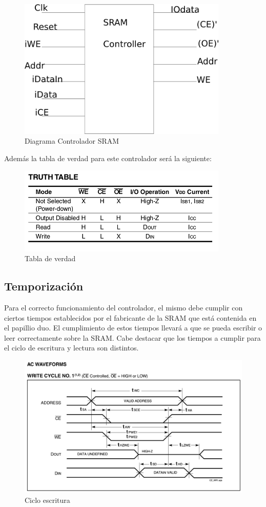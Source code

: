 \documentclass[10pt]{article}
\begin{document}
\begin{figure}[hbtp]
\centering
\includegraphics[width=10cm]{sramcontroller.png}
\caption{Diagrama Controlador SRAM}
\label{Con1}
\end{figure}

Además la tabla de verdad para este controlador será la siguiente:

\begin{figure}[hbtp]
\centering
\includegraphics[width=10cm]{truth-table.png}
\caption{Tabla de verdad}
\label{tab1}
\end{figure}

\newpage

\subsection*{Temporización}

Para el correcto funcionamiento del controlador, el mismo debe cumplir con ciertos tiempos establecidos por el fabricante de la SRAM que está contenida en el papillio duo. El cumplimiento de estos tiempos llevará a que se pueda escribir o leer correctamente sobre la SRAM.
Cabe destacar que los tiempos a cumplir para el ciclo de escritura y lectura son distintos.

\begin{figure}[hbtp]
\centering
\includegraphics[width=12cm]{write-form.png}
\caption{Ciclo escritura}
\label{Cic1}
\end{figure}
\end{document}
